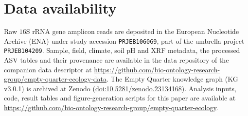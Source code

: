 \documentclass[fleqn,10pt,numbers]{olplainarticle}
\begin{document}



\section*{Data availability}
Raw $16$S rRNA gene amplicon reads are deposited in the European Nucleotide Archive (ENA) under study accession \texttt{PRJEB106069}, part of the umbrella project \texttt{PRJEB104209}. Sample, field, climate, soil pH and XRF metadata, the processed ASV tables and their provenance are available in the data repository of the companion data descriptor \cite{rubalkhali_datapaper} at \url{https://github.com/bio-ontology-research-group/empty-quarter-ecology-data}. The Empty Quarter knowledge graph (KG v3.0.1) is archived at Zenodo (\href{https://doi.org/10.5281/zenodo.23134168}{doi:10.5281/zenodo.23134168}). Analysis inputs, code, result tables and figure-generation scripts for this paper are available at \url{https://github.com/bio-ontology-research-group/empty-quarter-ecology}.
\end{document}
